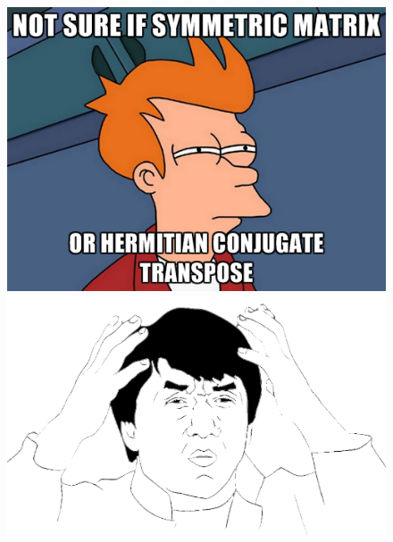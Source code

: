 \documentclass[14pt]{report}
\begin{document}
\begin{figure}
  \begin{center}
    \includegraphics[scale=0.5]{fry2.jpg}\\
    \includegraphics[scale=0.13]{chan.png}
  \end{center}
\end{figure}
\end{document}
